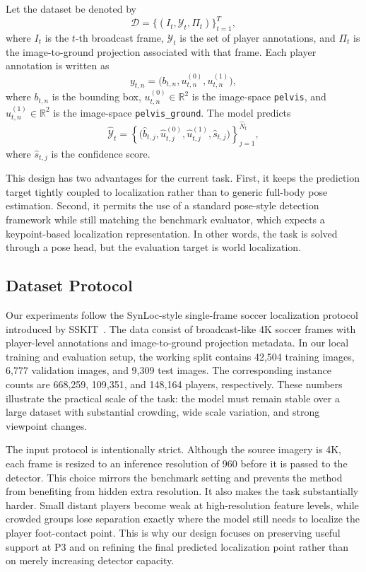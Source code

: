 \documentclass[runningheads]{llncs}
\begin{document}
Let the dataset be denoted by
\[
\mathcal{D}=\{(I_t,\mathcal{Y}_t,\Pi_t)\}_{t=1}^{T},
\]
where $I_t$ is the $t$-th broadcast frame, $\mathcal{Y}_t$ is the set of player annotations, and $\Pi_t$ is the image-to-ground projection associated with that frame. Each player annotation is written as
\[
y_{t,n}=\bigl(b_{t,n},u_{t,n}^{(0)},u_{t,n}^{(1)}\bigr),
\]
where $b_{t,n}$ is the bounding box, $u_{t,n}^{(0)} \in \mathbb{R}^2$ is the image-space \texttt{pelvis}, and $u_{t,n}^{(1)} \in \mathbb{R}^2$ is the image-space \texttt{pelvis\_ground}. The model predicts
\[
\hat{\mathcal{Y}}_t = \left\{\bigl(\hat{b}_{t,j},\hat{u}_{t,j}^{(0)},\hat{u}_{t,j}^{(1)},\hat{s}_{t,j}\bigr)\right\}_{j=1}^{\hat{N}_t},
\]
where $\hat{s}_{t,j}$ is the confidence score.

This design has two advantages for the current task. First, it keeps the prediction target tightly coupled to localization rather than to generic full-body pose estimation. Second, it permits the use of a standard pose-style detection framework while still matching the benchmark evaluator, which expects a keypoint-based localization representation. In other words, the task is solved through a pose head, but the evaluation target is world localization.

\subsection{Dataset Protocol}
\label{sec:dataset-protocol}

Our experiments follow the SynLoc-style single-frame soccer localization protocol introduced by SSKIT~\cite{ardo2025}. The data consist of broadcast-like 4K soccer frames with player-level annotations and image-to-ground projection metadata. In our local training and evaluation setup, the working split contains 42{,}504 training images, 6{,}777 validation images, and 9{,}309 test images. The corresponding instance counts are 668{,}259, 109{,}351, and 148{,}164 players, respectively. These numbers illustrate the practical scale of the task: the model must remain stable over a large dataset with substantial crowding, wide scale variation, and strong viewpoint changes.

The input protocol is intentionally strict. Although the source imagery is 4K, each frame is resized to an inference resolution of 960 before it is passed to the detector. This choice mirrors the benchmark setting and prevents the method from benefiting from hidden extra resolution. It also makes the task substantially harder. Small distant players become weak at high-resolution feature levels, while crowded groups lose separation exactly where the model still needs to localize the player foot-contact point. This is why our design focuses on preserving useful support at P3 and on refining the final predicted localization point rather than on merely increasing detector capacity.
\end{document}
